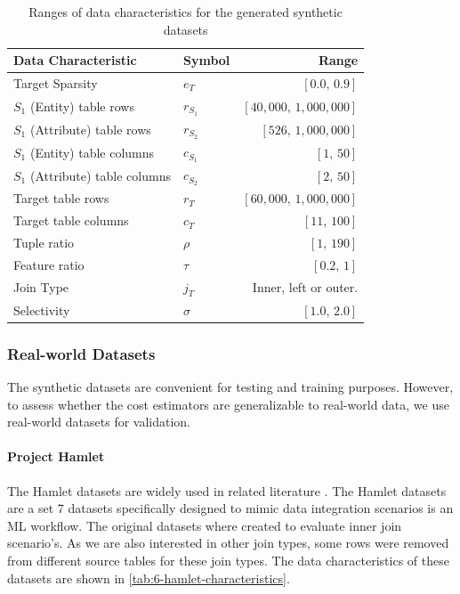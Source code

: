 \begin{table}[ht]
  \centering
  \begin{tabular}{llr}
    \toprule
    Data Characteristic             & Symbol    & Range                              \\ \midrule \midrule
    Target Sparsity                 & $e_T$     & $[ 0.0\text{,\ \ } 0.9]$           \\
    $S_1$ (Entity) table rows       & $r_{S_1}$ & $[ 40,000\text{,\ \ } 1,000,000]$  \\
    $S_1$ (Attribute) table rows    & $r_{S_2}$ & $[ 526\text{,\ \ } 1,000,000]$     \\
    $S_1$ (Entity) table columns    & $c_{S_1}$ & $[ 1\text{,\ \ } 50]$              \\
    $S_1$ (Attribute) table columns & $c_{S_2}$ & $[ 2\text{,\ \ } 50]$              \\
    Target table rows               & $r_T$     & $[ 60,000 \text{,\ \ } 1,000,000]$ \\
    Target table columns            & $c_T$     & $[ 11\text{,\ \ } 100]$            \\
    Tuple ratio                     & $\rho$    & $[ 1\text{,\ \ } 190]$             \\
    Feature ratio                   & $\tau$    & $[ 0.2\text{,\ \ } 1]$             \\
    Join Type                       & $j_T$     & Inner, left or outer.              \\
    Selectivity                     & $\sigma$  & $[ 1.0\text{,\ \ } 2.0]$           \\
    \bottomrule
  \end{tabular}
  \caption{Ranges of data characteristics for the generated synthetic datasets}
  \label{tab:6-synthetic-dataset-characteristics}
\end{table}


\subsubsection{Real-world Datasets}
The synthetic datasets are convenient for testing and training purposes. However, to assess whether the cost estimators are generalizable to real-world data, we use real-world datasets for validation.

\paragraph{Project Hamlet \cite{2016-hamlet-sigmod}}
The Hamlet datasets are widely used in related literature \cite{2016-hamlet-sigmod, amalur, morpheus,orion_learning_gen_lin_models}. The Hamlet datasets are a set 7 datasets specifically designed to mimic data integration scenarios is an ML workflow. The original datasets where created to evaluate inner join scenario's. As we are also interested in other join types, some rows were removed from different source tables for these join types. The data characteristics of these datasets are shown in \autoref{tab:6-hamlet-characteristics}.


